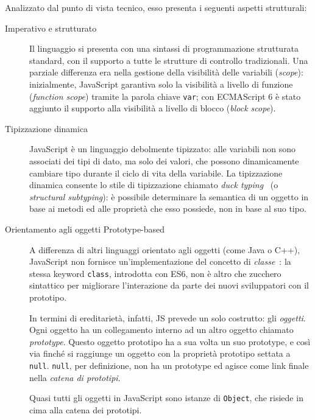       Analizzato dal punto di vista tecnico, esso presenta i seguenti aspetti strutturali:

      \begin{description}
        \item[Imperativo e strutturato]
          Il linguaggio si presenta con una sintassi di programmazione strutturata standard, con il supporto a tutte le strutture di controllo tradizionali.
          Una parziale differenza era nella gestione della visibilità delle variabili (\emph{scope}):
          inizialmente, JavaScript garantiva solo la visibilità a livello di funzione (\emph{function scope}) tramite la parola chiave \texttt{var};
          con ECMAScript 6 è stato aggiunto il supporto alla visibilità a livello di blocco (\emph{block scope}).

        \item[Tipizzazione dinamica]
          JavaScript è un linguaggio debolmente tipizzato:
          alle variabili non sono associati dei tipi di dato, ma solo dei valori, che possono dinamicamente cambiare tipo durante il ciclo di vita della variabile.
          La tipizzazione dinamica consente lo stile di tipizzazione chiamato \emph{duck typing}~\cite{10.1145/2103621.2103686} (o \emph{structural subtyping}):
          è possibile determinare la semantica di un oggetto in base ai metodi ed alle proprietà che esso possiede,  non in base al suo tipo.

        \item[Orientamento agli oggetti Prototype-based]
          A differenza di altri linguaggi orientato agli oggetti (come Java o C++), JavaScript non fornisce un'implementazione del concetto di \emph{classe}~\cite{Ungar1991}:
          la stessa keyword \texttt{class}, introdotta con ES6, non è altro che zucchero sintattico per migliorare l'interazione da parte dei nuovi sviluppatori con il prototipo.

          In termini di ereditarietà, infatti, JS prevede un solo costrutto: gli \emph{oggetti}.
          Ogni oggetto ha un collegamento interno ad un altro oggetto chiamato \emph{prototype}.
          Questo oggetto prototipo ha a sua volta un suo prototype, e così via finché si raggiunge un oggetto con la proprietà prototipo settata a \texttt{null}.
          \texttt{null}, per definizione, non ha un prototype ed agisce come link finale nella \emph{catena di prototipi}.

          Quasi tutti gli oggetti in JavaScript sono istanze di \texttt{Object}, che risiede in cima alla catena dei prototipi.


\end{description}

